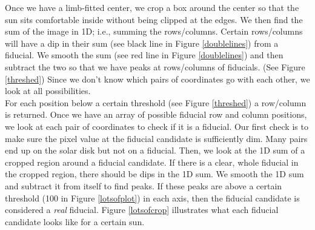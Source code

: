 \documentclass[10pt]{scrartcl}
\begin{document}
Once we have a limb-fitted center, we crop a box around the center so that the sun sits comfortable inside without being clipped at the edges. We then find the sum of the image in 1D; i.e., summing the rows/columns. Certain rows/columns will have a dip in their sum (see black line in Figure \ref{doublelines}) from a fiducial. We smooth the sum (see red line in Figure \ref{doublelines}) and then subtract the two so that we have peaks at rows/columns of fiducials. (See Figure \ref{threshed}) Since we don't know which pairs of coordinates go with each other, we look at all possibilities. \\

For each position below a certain threshold (see Figure \ref{threshed}) a row/column  is returned. Once we have an array of possible fiducial row and column positions, we look at each pair of coordinates to check if it is a fiducial. Our first check is to make sure the pixel value at the fiducial candidate is sufficiently dim. Many pairs end up on the solar disk but not on a fiducial. Then, we look at the 1D sum of a cropped region around a fiducial candidate. If there is a clear, whole fiducial in the cropped region, there should be dips in the 1D sum. We smooth the 1D sum and subtract it from itself to find peaks. If these peaks are above a certain threshold (100 in Figure \ref{lotsofplot}) in each axis, then the fiducial candidate is considered a \emph{real} fiducial. Figure \ref{lotsofcrop} illustrates what each fiducial candidate looks like for a certain sun. 
\end{document}

